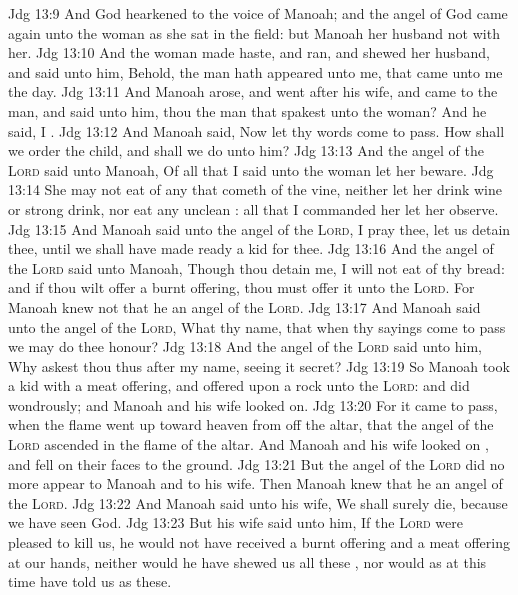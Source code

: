 \vs Jdg 13:9 And God hearkened to the voice of Manoah; and the angel of God came again unto the woman as she sat in the field: but Manoah her husband  not with her.
\vs Jdg 13:10 And the woman made haste, and ran, and shewed her husband, and said unto him, Behold, the man hath appeared unto me, that came unto me the  day.
\vs Jdg 13:11 And Manoah arose, and went after his wife, and came to the man, and said unto him,  thou the man that spakest unto the woman? And he said, I .
\vs Jdg 13:12 And Manoah said, Now let thy words come to pass. How shall we order the child, and  shall we do unto him?
\vs Jdg 13:13 And the angel of the \textsc{Lord} said unto Manoah, Of all that I said unto the woman let her beware.
\vs Jdg 13:14 She may not eat of any  that cometh of the vine, neither let her drink wine or strong drink, nor eat any unclean : all that I commanded her let her observe.
\vs Jdg 13:15 And Manoah said unto the angel of the \textsc{Lord}, I pray thee, let us detain thee, until we shall have made ready a kid for thee.
\vs Jdg 13:16 And the angel of the \textsc{Lord} said unto Manoah, Though thou detain me, I will not eat of thy bread: and if thou wilt offer a burnt offering, thou must offer it unto the \textsc{Lord}. For Manoah knew not that he  an angel of the \textsc{Lord}.
\vs Jdg 13:17 And Manoah said unto the angel of the \textsc{Lord}, What  thy name, that when thy sayings come to pass we may do thee honour?
\vs Jdg 13:18 And the angel of the \textsc{Lord} said unto him, Why askest thou thus after my name, seeing it  secret?
\vs Jdg 13:19 So Manoah took a kid with a meat offering, and offered  upon a rock unto the \textsc{Lord}: and  did wondrously; and Manoah and his wife looked on.
\vs Jdg 13:20 For it came to pass, when the flame went up toward heaven from off the altar, that the angel of the \textsc{Lord} ascended in the flame of the altar. And Manoah and his wife looked on , and fell on their faces to the ground.
\vs Jdg 13:21 But the angel of the \textsc{Lord} did no more appear to Manoah and to his wife. Then Manoah knew that he  an angel of the \textsc{Lord}.
\vs Jdg 13:22 And Manoah said unto his wife, We shall surely die, because we have seen God.
\vs Jdg 13:23 But his wife said unto him, If the \textsc{Lord} were pleased to kill us, he would not have received a burnt offering and a meat offering at our hands, neither would he have shewed us all these , nor would as at this time have told us  as these.
